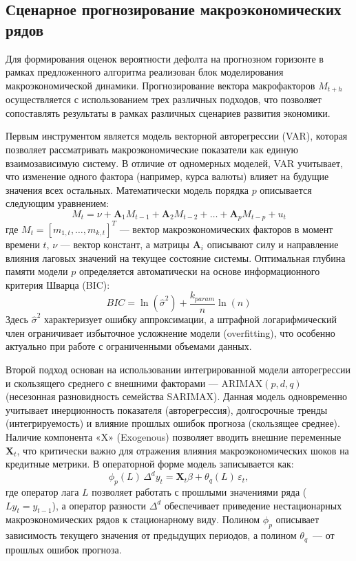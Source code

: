 \documentclass[]{article}
\begin{document}
	\subsection{Сценарное прогнозирование макроэкономических рядов}
	\label{macro_forecast}

	Для формирования оценок вероятности дефолта на прогнозном горизонте в рамках предложенного алгоритма
	реализован блок моделирования макроэкономической динамики. Прогнозирование вектора макрофакторов
	$M_{t+h}$ осуществляется с использованием трех различных подходов, что позволяет сопоставлять
	результаты в рамках различных сценариев развития экономики.

	Первым инструментом является модель векторной авторегрессии (VAR), которая позволяет рассматривать
	макроэкономические показатели как единую взаимозависимую систему. В отличие от одномерных моделей, VAR
	учитывает, что изменение одного фактора (например, курса валюты) влияет на будущие значения всех остальных.
	Математически модель порядка $p$ описывается следующим уравнением:
	\begin{equation}
		M_t = \nu + \mathbf{A}_1 M_{t-1} + \mathbf{A}_2 M_{t-2} + \dots + \mathbf{A}_p M_{t-p} + u_t
	\end{equation}
	где $M_t = [m_{1,t}, \dots, m_{k,t}]^T$ --- вектор макроэкономических факторов в момент времени $t$,
	$\nu$ --- вектор констант, а матрицы $\mathbf{A}_i$ описывают силу и направление влияния лаговых значений на
	текущее состояние системы.
	Оптимальная глубина памяти модели $p$ определяется автоматически на основе информационного критерия Шварца (BIC):
	\begin{equation}
		BIC = \ln(\hat{\sigma}^2) + \frac{k_{param}}{n} \ln(n)
	\end{equation}
	Здесь $\hat{\sigma}^2$ характеризует ошибку аппроксимации, а штрафной логарифмический член ограничивает
	избыточное усложнение модели (overfitting), что особенно актуально при работе с ограниченными объемами данных.

	Второй подход основан на использовании интегрированной модели авторегрессии и скользящего среднего
	с внешними факторами --- ARIMAX$(p, d, q)$ (несезонная разновидность семейства SARIMAX). Данная модель
	одновременно учитывает инерционность показателя (авторегрессия), долгосрочные тренды (интегрируемость)
	и влияние прошлых ошибок прогноза (скользящее среднее). Наличие компонента «X» (Exogenous) позволяет
	вводить внешние переменные $\mathbf{X}_t$, что критически важно для отражения влияния
	макроэкономических шоков на кредитные метрики. В операторной форме модель записывается как:
	\begin{equation}
		\phi_p(L)\, \Delta^d y_t = \mathbf{X}_t \beta + \theta_q(L)\, \varepsilon_t,
	\end{equation}
	где оператор лага $L$ позволяет работать с прошлыми значениями ряда ($L y_t = y_{t-1}$),
	а оператор разности $\Delta^d$ обеспечивает приведение нестационарных макроэкономических
	рядов к стационарному виду. Полином $\phi_p$ описывает зависимость текущего значения
	от предыдущих периодов, а полином $\theta_q$~--- от прошлых ошибок прогноза.
\end{document}
